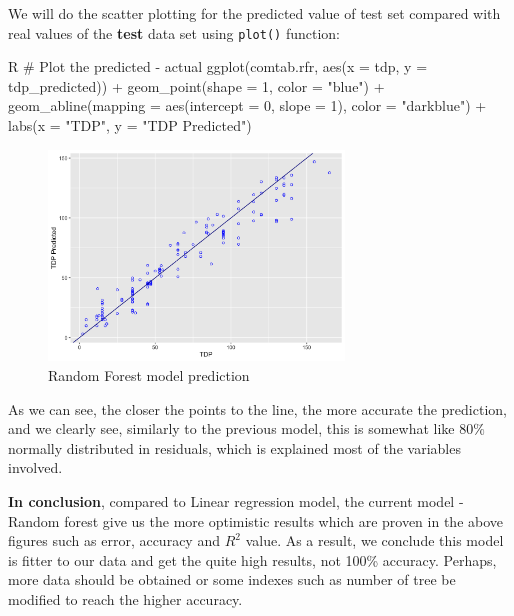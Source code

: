 We will do the scatter plotting for the predicted value of test set compared with real values of the \textbf{test} data set using \verb|plot()| function:
\begin{code}{R}
# Plot the predicted - actual
ggplot(comtab.rfr, aes(x = tdp, y = tdp_predicted)) +
  geom_point(shape = 1, color = "blue") +
  geom_abline(mapping = aes(intercept = 0, slope = 1), color = "darkblue") +
  labs(x = "TDP", y = "TDP Predicted")
\end{code}
\begin{figure}[H]
    \centering
    \includegraphics[width=0.7\textwidth]{graphics/randomPlot.png}
    \caption{Random Forest model prediction}
    \label{fig:random_trend}
\end{figure}

As we can see, the closer the points to the line, the more accurate the prediction, and we clearly see, similarly to the previous model, this is somewhat like $80\%$ normally distributed in residuals, which is explained most of the variables involved.

\textbf{In conclusion}, compared to Linear regression model, the current model - Random forest give us the more optimistic results which are proven in the above figures such as error, accuracy and \(R^2\) value. As a result, we conclude this model is fitter to our data and get the quite high results, not 100\% accuracy. Perhaps, more data should be obtained or some indexes such as number of tree be modified to reach the higher accuracy.













